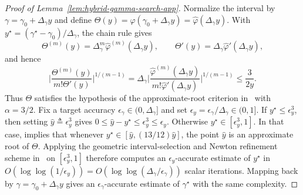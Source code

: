 \documentclass[11pt, letterpaper, oneside, reqno]{amsart}
\newcommand{\opt}{^\star}
\newcommand{\Let}{\triangleq}
\begin{document}
\begin{proof}[Proof of Lemma~\ref{lem:hybrid-gamma-search-app}]
Normalize the interval by $\gamma=\gamma_0+\Delta_\gamma y$ and define $\Theta(y) = \varphi(\gamma_0+\Delta_\gamma y)=\widehat\varphi(\Delta_\gamma y)$.
With $y\opt=(\gamma\opt-\gamma_0)/\Delta_\gamma$, the chain rule gives
\[
\Theta^{(m)}(y)=\Delta_\gamma^m \widehat\varphi^{(m)}(\Delta_\gamma y),
\qquad
\Theta'(y)=\Delta_\gamma \widehat\varphi'(\Delta_\gamma y),
\]
and hence
\[
\bigl| \frac{\Theta^{(m)}(y)}{m!\Theta'(y)} \bigr|^{1/(m-1)}
= \Delta_\gamma \bigl| \frac{\widehat\varphi^{(m)}(\Delta_\gamma y)}{m!\widehat\varphi'(\Delta_\gamma y)} \bigr|^{1/(m-1)}
\le \frac{3}{2y}.
\]
Thus $\Theta$ satisfies the hypothesis of the approximate-root criterion in~\cite[Theorem~2]{ref:ye1992new} with $\alpha=3/2$.
Fix a target accuracy $\epsilon_\gamma\in(0,\Delta_\gamma]$ and set
$\epsilon_y = \epsilon_\gamma/\Delta_\gamma \in (0,1]$.
If $y\opt \le \epsilon_y^3$, then setting $\hat y \Let \epsilon_y^3$ gives
$0 \le \hat y-y\opt \le \epsilon_y^3 \le \epsilon_y$.
Otherwise $y\opt\in[\epsilon_y^3,1]$. In that case, \cite[Theorem~2]{ref:ye1992new} implies that whenever $y\opt\in[\hat y,(13/12)\hat y]$, the point $\hat y$ is an approximate root of $\Theta$. Applying the geometric interval-selection and Newton refinement scheme in~\cite[Section~4]{ref:ye1992new} on $[\epsilon_y^3,1]$ therefore computes an $\epsilon_y$-accurate estimate of $y\opt$ in
$O\left(\log\log(1/\epsilon_y)\right)
= O\left(\log\log(\Delta_\gamma/\epsilon_\gamma)\right)$
scalar iterations. Mapping back by $\gamma=\gamma_0+\Delta_\gamma y$ gives an $\epsilon_\gamma$-accurate estimate of $\gamma\opt$ with the same complexity.
\end{proof}
\end{document}
